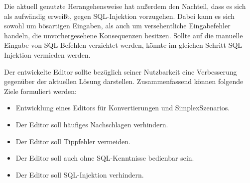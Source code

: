 Die aktuell genutzte Herangehensweise hat außerdem den Nachteil, dass es sich als aufwändig erweißt, gegen \ac{SQL}-Injektion vorzugehen. Dabei kann es sich sowohl um bösartigen Eingaben, als auch um versehentliche Eingabefehler handeln, die unvorhergesehene Konsequenzen besitzen. Sollte auf die manuelle Eingabe von \ac{SQL}-Befehlen verzichtet werden, könnte im gleichen Schritt \ac{SQL}-Injektion vermieden werden.

\pskip
Der entwickelte Editor sollte bezüglich seiner Nutzbarkeit eine Verbesserung gegenüber der aktuellen Lösung darstellen. Zusammenfassend können folgende Ziele formuliert werden:
\begin{itemize}
  \item Entwicklung eines Editors für Konvertierungen und SimplexSzenarios.
  \item Der Editor soll häufiges Nachschlagen verhindern.
  \item Der Editor soll Tippfehler vermeiden.
  \item Der Editor soll auch ohne \ac{SQL}-Kenntnisse bedienbar sein.
  \item Der Editor soll \ac{SQL}-Injektion verhindern.
\end{itemize}
